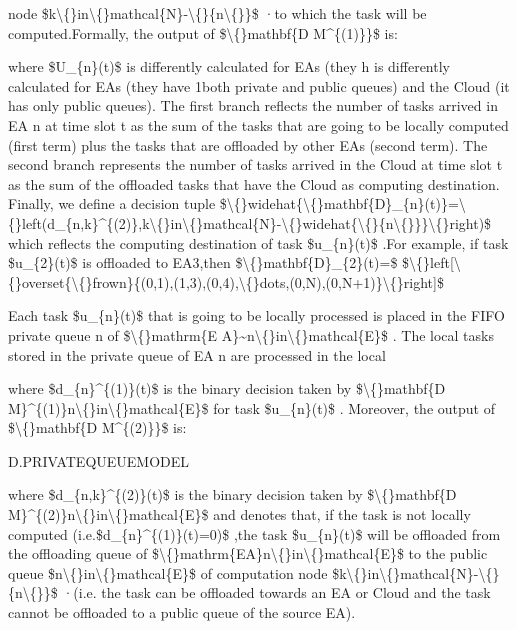 \documentclass{article}
\begin{document}
node \$k\textbackslash\{\}in\textbackslash\{\}mathcal\{N\}-\textbackslash\{\}\{n\textbackslash\{\}\}\$ ·to which the task will be computed.Formally, the output of \$\textbackslash\{\}mathbf\{D M\textasciicircum{}\{(1)\}\}\$ is:

where \$U\_\{n\}(t)\$ is differently calculated for EAs (they h is differently calculated for EAs (they have 1both private and public queues) and the Cloud (it has only public queues). The first branch reflects the number of tasks arrived in EA n at time slot t as the sum of the tasks that are going to be locally computed (first term) plus the tasks that are offloaded by other EAs (second term). The second branch represents the number of tasks arrived in the Cloud at time slot t as the sum of the offloaded tasks that have the Cloud as computing destination. Finally, we define a decision tuple \$\textbackslash\{\}widehat\{\textbackslash\{\}mathbf\{D\}\_\{n\}(t)\}=\textbackslash\{\}left(d\_\{n,k\}\textasciicircum{}\{(2)\},k\textbackslash\{\}in\textbackslash\{\}mathcal\{N\}-\textbackslash\{\}widehat\{\textbackslash\{\}\{n\textbackslash\{\}\}\}\textbackslash\{\}right)\$ which reflects the computing destination of task \$u\_\{n\}(t)\$ .For example, if task \$u\_\{2\}(t)\$ is offloaded to EA3,then \$\textbackslash\{\}mathbf\{D\}\_\{2\}(t)=\$ 
\$\textbackslash\{\}left[\textbackslash\{\}overset\{\textbackslash\{\}frown\}\{(0,1),(1,3),(0,4),\textbackslash\{\}dots,(0,N),(0,N+1)\}\textbackslash\{\}right]\$

Each task \$u\_\{n\}(t)\$ that is going to be locally processed is placed in the FIFO private queue n of \$\textbackslash\{\}mathrm\{E A\}\textasciitilde{}n\textbackslash\{\}in\textbackslash\{\}mathcal\{E\}\$ . The local tasks stored in the private queue of EA n are processed in the local

where \$d\_\{n\}\textasciicircum{}\{(1)\}(t)\$ is the binary decision taken by \$\textbackslash\{\}mathbf\{D M\}\textasciicircum{}\{(1)\}n\textbackslash\{\}in\textbackslash\{\}mathcal\{E\}\$ for task \$u\_\{n\}(t)\$ . Moreover, the output of \$\textbackslash\{\}mathbf\{D M\textasciicircum{}\{(2)\}\}\$ is:

D.PRIVATEQUEUEMODEL

where \$d\_\{n,k\}\textasciicircum{}\{(2)\}(t)\$ is the binary decision taken by \$\textbackslash\{\}mathbf\{D M\}\textasciicircum{}\{(2)\}n\textbackslash\{\}in\textbackslash\{\}mathcal\{E\}\$ and denotes that, if the task is not locally computed (i.e.\$d\_\{n\}\textasciicircum{}\{(1)\}(t)=0)\$ ,the task \$u\_\{n\}(t)\$ will be offloaded from the offloading queue of \$\textbackslash\{\}mathrm\{EA\}n\textbackslash\{\}in\textbackslash\{\}mathcal\{E\}\$ to the public queue \$n\textbackslash\{\}in\textbackslash\{\}mathcal\{E\}\$ of computation node \$k\textbackslash\{\}in\textbackslash\{\}mathcal\{N\}-\textbackslash\{\}\{n\textbackslash\{\}\}\$ ·(i.e. the task can be offloaded towards an EA or Cloud and the task cannot be offloaded to a public queue of the source EA).
\end{document}
